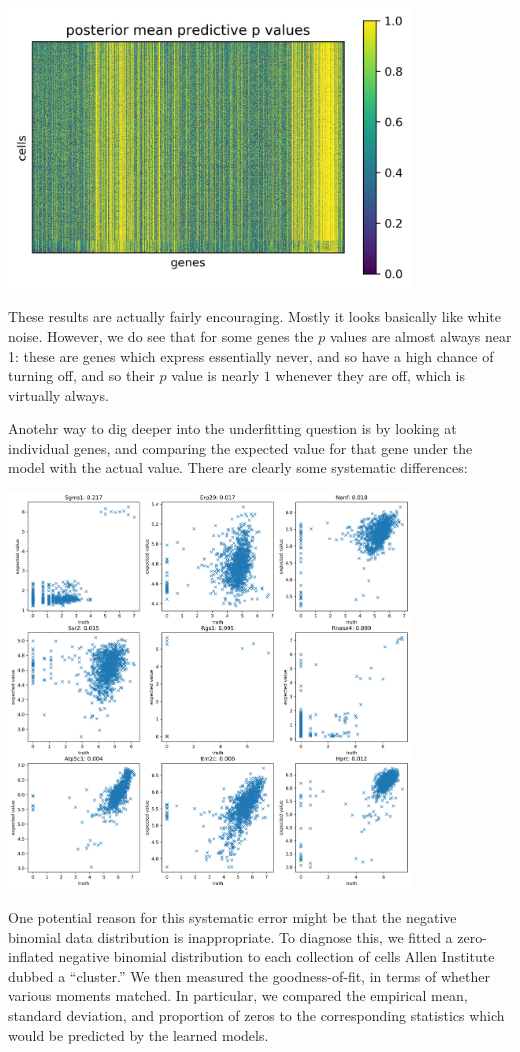 \includegraphics[width=0.8\textwidth]{pics/resids}

These results are actually fairly encouraging.  Mostly it looks basically like white noise.  However, we do see that for some genes the $p$ values are almost always near 1: these are genes which express essentially never, and so have a high chance of turning off, and so their $p$ value is nearly $1$ whenever they are off, which is virtually always.  

Anotehr way to dig deeper into the underfitting question is by looking at individual genes, and comparing the expected value for that gene under the model with the actual value.  There are clearly some systematic differences:

\includegraphics[width=0.8\textwidth]{pics/residsdetail}

One potential reason for this systematic error might be that the negative binomial data distribution is inappropriate.  To diagnose this, we fitted a zero-inflated negative binomial distribution to each collection of cells Allen Institute dubbed a ``cluster.''  We then measured the goodness-of-fit, in terms of whether various moments matched.  In particular, we compared the empirical mean, standard deviation, and proportion of zeros to the corresponding statistics which would be predicted by the learned models.  

